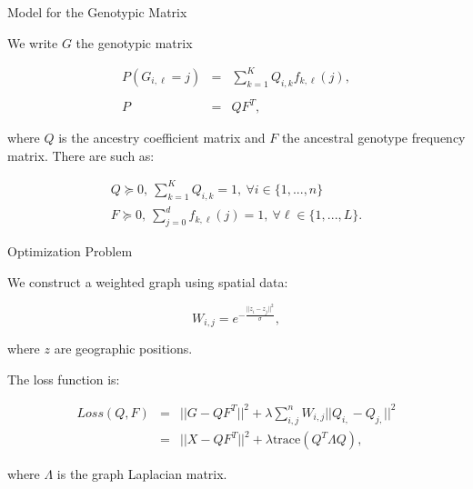\documentclass{beamer}\usepackage[]{graphicx}\usepackage[]{color}
\begin{document}
\begin{frame}{Model for the Genotypic Matrix}

We write $G$ the genotypic matrix

\begin{equation*}
\begin{array}{rcl}
P(G_{i,\ell} = j) & = & \sum_{k=1}^K Q_{i,k} f_{k,\ell}(j),\\
\\
P &=& QF^T,
\end{array}
\end{equation*}

where $Q$ is the ancestry coefficient matrix and $F$ the ancestral genotype 
frequency matrix. There are such as: 

\begin{equation*}
\begin{aligned}
Q \succeq 0,~\sum_{k=1}^{K} Q_{i,k} = 1,~\forall i \in \{1,...,n\}  \\
F \succeq 0,~\sum_{j=0}^{d} f_{k,\ell}(j) = 1,~\forall \ell \in \{1,...,L\}.
\end{aligned}
\end{equation*}

\end{frame}


\begin{frame}{Optimization Problem}

We construct a weighted graph using spatial data:

\begin{equation*}
W_{i,j} = e^{ - \frac{||z_i - z_j||^2}{\sigma}},
\end{equation*}

where $z$ are geographic positions.

The loss function is:

\begin{equation*}
\begin{aligned}
Loss(Q,F)& = &||G - QF^T||^2 + \lambda \sum_{i,j}^{n} W_{i,j} ||Q_{i,} - Q_{j,}||^2 \\
 &= &||X-QF^T||^2 + \lambda \text{trace}(Q^T \Lambda Q),
\end{aligned}
\end{equation*}

where $\Lambda$ is the graph Laplacian matrix.

\end{frame}
\end{document}
